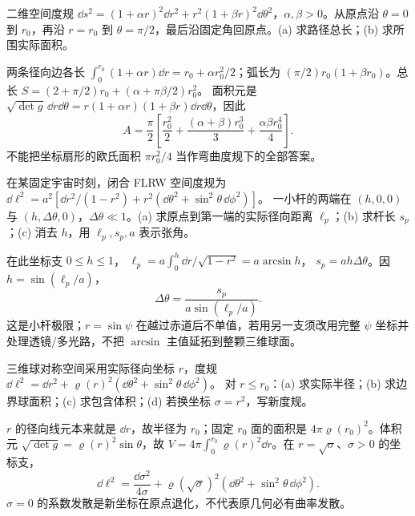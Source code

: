 \begin{exercise}
二维空间度规 $\dd s^2=(1+\alpha r)^2\dd r^2+r^2(1+\beta r)^2\dd\theta^2$，$\alpha,\beta>0$。从原点沿 $\theta=0$ 到 $r_0$，再沿 $r=r_0$ 到 $\theta=\pi/2$，最后沿固定角回原点。(a) 求路径总长；(b) 求所围实际面积。
\end{exercise}
\begin{solution}
两条径向边各长 $\int_0^{r_0}(1+\alpha r)\dd r=r_0+\alpha r_0^2/2$；弧长为 $(\pi/2)r_0(1+\beta r_0)$。总长
$S=(2+\pi/2)r_0+(\alpha+\pi\beta/2)r_0^2$。
面积元是 $\sqrt{\det g}\,\dd r\dd\theta=r(1+\alpha r)(1+\beta r)\dd r\dd\theta$，因此
\[
A=\frac{\pi}{2}\left[\frac{r_0^2}{2}
+\frac{(\alpha+\beta)r_0^3}{3}
+\frac{\alpha\beta r_0^4}{4}\right].
\]
不能把坐标扇形的欧氏面积 $\pi r_0^2/4$ 当作弯曲度规下的全部答案。
\end{solution}

\begin{exercise}
在某固定宇宙时刻，闭合 FLRW 空间度规为
$\dd\ell^2=a^2[\dd r^2/(1-r^2)+r^2(\dd\theta^2+\sin^2\theta\,\dd\phi^2)]$。
一小杆的两端在 $(h,0,0)$ 与 $(h,\Delta\theta,0)$，$\Delta\theta\ll1$。(a) 求原点到第一端的实际径向距离 $\ell_p$；(b) 求杆长 $s_p$；(c) 消去 $h$，用 $\ell_p,s_p,a$ 表示张角。
\end{exercise}
\begin{solution}
在此坐标支 $0\le h\le1$，
$\ell_p=a\int_0^h\dd r/\sqrt{1-r^2}=a\arcsin h$，
$s_p=ah\Delta\theta$。因 $h=\sin(\ell_p/a)$，
\[
\Delta\theta=\frac{s_p}{a\sin(\ell_p/a)}.
\]
这是小杆极限；$r=\sin\psi$ 在越过赤道后不单值，若用另一支须改用完整 $\psi$ 坐标并处理透镜/多光路，不把 $\arcsin$ 主值延拓到整颗三维球面。
\end{solution}

\begin{exercise}
三维球对称空间采用实际径向坐标 $r$，度规
$\dd\ell^2=\dd r^2+\varrho(r)^2(\dd\theta^2+\sin^2\theta\,\dd\phi^2)$。
对 $r\le r_0$：(a) 求实际半径；(b) 求边界球面积；(c) 求包含体积；(d) 若换坐标 $\sigma=r^2$，写新度规。
\end{exercise}
\begin{solution}
$r$ 的径向线元本来就是 $\dd r$，故半径为 $r_0$；固定 $r_0$ 面的面积是 $4\pi\varrho(r_0)^2$。体积元 $\sqrt{\det g}=\varrho(r)^2\sin\theta$，故
$V=4\pi\int_0^{r_0}\varrho(r)^2\dd r$。在 $r=\sqrt\sigma$、$\sigma>0$ 的坐标支，
\[
\dd\ell^2=\frac{\dd\sigma^2}{4\sigma}
+\varrho(\sqrt\sigma)^2
(\dd\theta^2+\sin^2\theta\,\dd\phi^2).
\]
$\sigma=0$ 的系数发散是新坐标在原点退化，不代表原几何必有曲率发散。
\end{solution}

